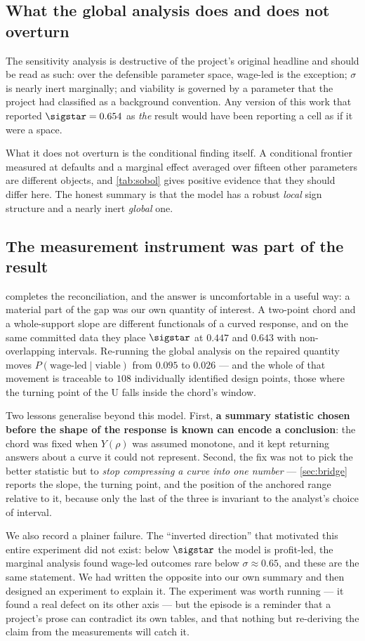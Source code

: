 \subsection{What the global analysis does and does not overturn}

The sensitivity analysis is destructive of the project's original headline and
should be read as such: over the defensible parameter space, wage-led is the
exception; $\sigma$ is nearly inert marginally; and viability is governed by a
parameter that the project had classified as a background convention. Any
version of this work that reported $\sigstar = 0.654$ as \emph{the} result
would have been reporting a cell as if it were a space.

What it does not overturn is the conditional finding itself. A conditional
frontier measured at defaults and a marginal effect averaged over fifteen
other parameters are different objects, and \cref{tab:sobol} gives positive
evidence that they should differ here. The honest summary is that the model
has a robust \emph{local} sign structure and a nearly inert \emph{global} one.

\subsection{The measurement instrument was part of the result}

 completes the reconciliation, and the answer is
uncomfortable in a useful way: a material part of the gap was our own
quantity of interest. A two-point chord and a whole-support slope are
different functionals of a curved response, and on the same committed data
they place $\sigstar$ at $0.447$ and $0.643$ with non-overlapping intervals.
Re-running the global analysis on the repaired quantity moves
$P(\text{wage-led} \mid \text{viable})$ from $0.095$ to $0.026$ --- and the
whole of that movement is traceable to $108$ individually identified design
points, those where the turning point of the U falls inside the chord's
window.

Two lessons generalise beyond this model. First, \textbf{a summary statistic
chosen before the shape of the response is known can encode a conclusion}: the
chord was fixed when $Y(\rho)$ was assumed monotone, and it kept returning
answers about a curve it could not represent. Second, the fix was not to pick
the better statistic but to \emph{stop compressing a curve into one number} ---
\cref{sec:bridge} reports the slope, the turning point, and the position of
the anchored range relative to it, because only the last of the three is
invariant to the analyst's choice of interval.

We also record a plainer failure. The ``inverted direction'' that motivated
this entire experiment did not exist: below $\sigstar$ the model is profit-led,
the marginal analysis found wage-led outcomes rare below $\sigma \approx 0.65$,
and these are the same statement. We had written the opposite into our own
summary and then designed an experiment to explain it. The experiment was
worth running --- it found a real defect on its other axis --- but the episode
is a reminder that a project's prose can contradict its own tables, and that
nothing but re-deriving the claim from the measurements will catch it.
